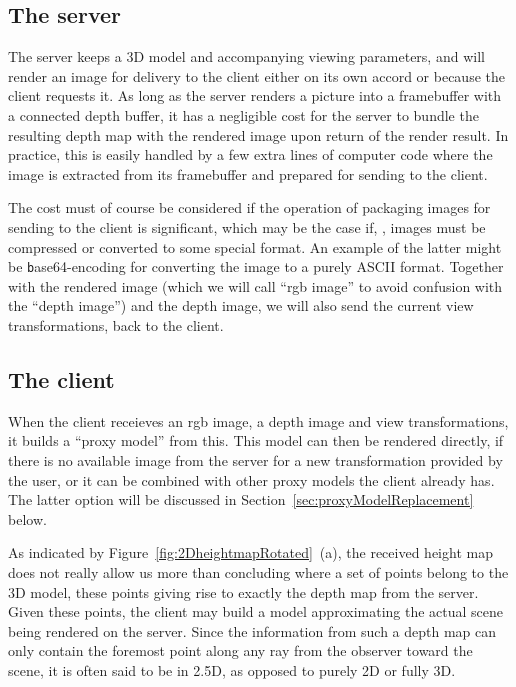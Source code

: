 \subsection{The server}

The server keeps a 3D model and accompanying viewing parameters, and will render
an image for delivery to the client either on its own accord or because the
client requests it. As long as the server renders a picture into a framebuffer
with a connected depth buffer, it has a negligible cost for the server to bundle
the resulting depth map with the rendered image upon return of the render
result. In practice, this is easily handled by a few extra lines of computer
code where the image is extracted from its framebuffer and prepared for sending
to the client.

The cost must of course be considered if the operation of packaging images for
sending to the client is significant, which may be the case if, \eg, images must
be compressed or converted to some special format. An example of the latter
might be {\texttt base64}-encoding for converting the image to a purely ASCII
format. Together with the rendered image (which we will call ``rgb image'' to
avoid confusion with the ``depth image'') and the depth image, we will also send
the current view transformations, back to the client.


\subsection{The client}

When the client receieves an rgb image, a depth image and view transformations,
it builds a ``proxy model'' from this. This model can then be rendered directly,
if there is no available image from the server for a new transformation provided
by the user, or it can be combined with other proxy models the client already
has. The latter option will be discussed in
Section~\ref{sec:proxyModelReplacement} below.



As indicated by Figure~\ref{fig:2DheightmapRotated}~(a), the received
height map does not really allow us more than concluding where a set of points
belong to the 3D model, these points giving rise to exactly the depth map from
the server. Given these points, the client may build a model approximating the
actual scene being rendered on the server. Since the information from such a
depth map can only contain the foremost point along any ray from the observer
toward the scene, it is often said to be in 2.5D, as opposed to purely 2D or
fully 3D.

